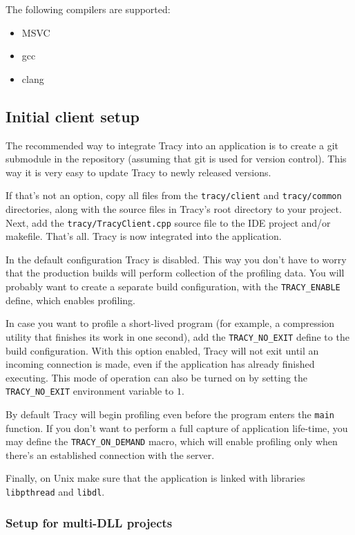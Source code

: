 \documentclass[hidelinks,titlepage,a4paper]{article}
\begin{document}
The following compilers are supported:

\begin{itemize}
\item MSVC
\item gcc
\item clang
\end{itemize}

\subsection{Initial client setup}

The recommended way to integrate Tracy into an application is to create a git submodule in the repository (assuming that git is used for version control). This way it is very easy to update Tracy to newly released versions.

If that's not an option, copy all files from the \texttt{tracy/client} and \texttt{tracy/common} directories, along with the source files in Tracy's root directory to your project. Next, add the \texttt{tracy/TracyClient.cpp} source file to the IDE project and/or makefile. That's all. Tracy is now integrated into the application.

In the default configuration Tracy is disabled. This way you don't have to worry that the production builds will perform collection of the profiling data. You will probably want to create a separate build configuration, with the \texttt{TRACY\_ENABLE} define, which enables profiling.

In case you want to profile a short-lived program (for example, a compression utility that finishes its work in one second), add the \texttt{TRACY\_NO\_EXIT} define to the build configuration. With this option enabled, Tracy will not exit until an incoming connection is made, even if the application has already finished executing. This mode of operation can also be turned on by setting the \texttt{TRACY\_NO\_EXIT} environment variable to $1$.

By default Tracy will begin profiling even before the program enters the \texttt{main} function. If you don't want to perform a full capture of application life-time, you may define the \texttt{TRACY\_ON\_DEMAND} macro, which will enable profiling only when there's an established connection with the server.

Finally, on Unix make sure that the application is linked with libraries \texttt{libpthread} and \texttt{libdl}.

\subsubsection{Setup for multi-DLL projects}
\end{document}
